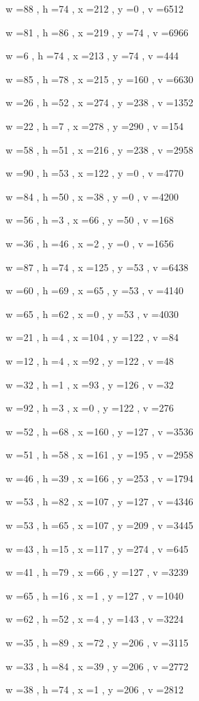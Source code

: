 \documentclass[11pt]{article}
\begin{document}
w =88 , h =74 , x =212 , y =0 , v =6512
\par
w =81 , h =86 , x =219 , y =74 , v =6966
\par
w =6 , h =74 , x =213 , y =74 , v =444
\par
w =85 , h =78 , x =215 , y =160 , v =6630
\par
w =26 , h =52 , x =274 , y =238 , v =1352
\par
w =22 , h =7 , x =278 , y =290 , v =154
\par
w =58 , h =51 , x =216 , y =238 , v =2958
\par
w =90 , h =53 , x =122 , y =0 , v =4770
\par
w =84 , h =50 , x =38 , y =0 , v =4200
\par
w =56 , h =3 , x =66 , y =50 , v =168
\par
w =36 , h =46 , x =2 , y =0 , v =1656
\par
w =87 , h =74 , x =125 , y =53 , v =6438
\par
w =60 , h =69 , x =65 , y =53 , v =4140
\par
w =65 , h =62 , x =0 , y =53 , v =4030
\par
w =21 , h =4 , x =104 , y =122 , v =84
\par
w =12 , h =4 , x =92 , y =122 , v =48
\par
w =32 , h =1 , x =93 , y =126 , v =32
\par
w =92 , h =3 , x =0 , y =122 , v =276
\par
w =52 , h =68 , x =160 , y =127 , v =3536
\par
w =51 , h =58 , x =161 , y =195 , v =2958
\par
w =46 , h =39 , x =166 , y =253 , v =1794
\par
w =53 , h =82 , x =107 , y =127 , v =4346
\par
w =53 , h =65 , x =107 , y =209 , v =3445
\par
w =43 , h =15 , x =117 , y =274 , v =645
\par
w =41 , h =79 , x =66 , y =127 , v =3239
\par
w =65 , h =16 , x =1 , y =127 , v =1040
\par
w =62 , h =52 , x =4 , y =143 , v =3224
\par
w =35 , h =89 , x =72 , y =206 , v =3115
\par
w =33 , h =84 , x =39 , y =206 , v =2772
\par
w =38 , h =74 , x =1 , y =206 , v =2812
\par
\newpage
\end{document}
